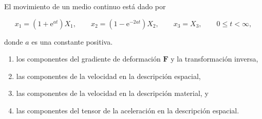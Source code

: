 \documentclass[../main.tex]{subfiles}
\begin{document}
\begin{problema}
	El movimiento de un medio continuo está dado por

	\begin{equation*}
		x_{1} = (1 + \mathrm{e}^{at})X_{1},\qquad
		x_{2} = (1 - \mathrm{e}^{-2at})X_{2},\qquad
		x_{3} = X_{3},\qquad
		0 \leq t < \infty,
	\end{equation*}

	donde \(a\) es una constante positiva.

	\begin{enumerate}
		\item los componentes del gradiente de deformación \(\bm{F}\) y
		      la transformación inversa,
		\item las componentes de la velocidad en la descripción espacial,
		\item las componentes de la velocidad en la descripción material, y
		\item las componentes del tensor de la aceleración en la
		      descripción espacial.
	\end{enumerate}
\end{problema}
\end{document}
